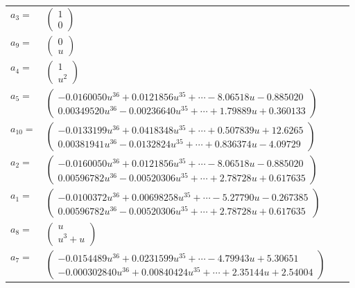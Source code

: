 \documentclass[1p]{elsarticle_modified}
\theoremstyle{definition}
\begin{document}
\begin{tabular}{m{7pt} m{180pt} m{7pt} m{180pt} }
\flushright $a_{3}=$&$\begin{pmatrix}1\\0\end{pmatrix}$ \\
\flushright $a_{9}=$&$\begin{pmatrix}0\\u\end{pmatrix}$ \\
\flushright $a_{4}=$&$\begin{pmatrix}1\\u^2\end{pmatrix}$ \\
\flushright $a_{5}=$&$\begin{pmatrix}-0.0160050 u^{36}+0.0121856 u^{35}+\cdots-8.06518 u-0.885020\\0.00349520 u^{36}-0.00236640 u^{35}+\cdots+1.79889 u+0.360133\end{pmatrix}$ \\
\flushright $a_{10}=$&$\begin{pmatrix}-0.0133199 u^{36}+0.0418348 u^{35}+\cdots+0.507839 u+12.6265\\0.00381941 u^{36}-0.0132824 u^{35}+\cdots+0.836374 u-4.09729\end{pmatrix}$ \\
\flushright $a_{2}=$&$\begin{pmatrix}-0.0160050 u^{36}+0.0121856 u^{35}+\cdots-8.06518 u-0.885020\\0.00596782 u^{36}-0.00520306 u^{35}+\cdots+2.78728 u+0.617635\end{pmatrix}$ \\
\flushright $a_{1}=$&$\begin{pmatrix}-0.0100372 u^{36}+0.00698258 u^{35}+\cdots-5.27790 u-0.267385\\0.00596782 u^{36}-0.00520306 u^{35}+\cdots+2.78728 u+0.617635\end{pmatrix}$ \\
\flushright $a_{8}=$&$\begin{pmatrix}u\\u^3+u\end{pmatrix}$ \\
\flushright $a_{7}=$&$\begin{pmatrix}-0.0154489 u^{36}+0.0231599 u^{35}+\cdots-4.79943 u+5.30651\\-0.000302840 u^{36}+0.00840424 u^{35}+\cdots+2.35144 u+2.54004\end{pmatrix}$ \\

\end{tabular}
\end{document}
